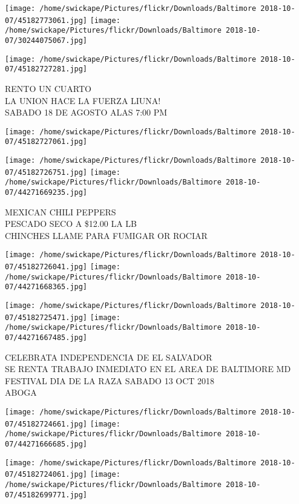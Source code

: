\documentclass[10pt,letterpaper]{article}
\begin{document}
\texttt{[image: /home/swickape/Pictures/flickr/Downloads/Baltimore 2018-10-07/45182773061.jpg]}
\texttt{[image: /home/swickape/Pictures/flickr/Downloads/Baltimore 2018-10-07/30244075067.jpg]}

\texttt{[image: /home/swickape/Pictures/flickr/Downloads/Baltimore 2018-10-07/45182727281.jpg]}

RENTO UN CUARTO\\
LA UNION HACE LA FUERZA LIUNA!\\
SABADO 18 DE AGOSTO ALAS 7:00 PM\\
\pagebreak

\texttt{[image: /home/swickape/Pictures/flickr/Downloads/Baltimore 2018-10-07/45182727061.jpg]}

\vspace{0.25in}
\texttt{[image: /home/swickape/Pictures/flickr/Downloads/Baltimore 2018-10-07/45182726751.jpg]}
\texttt{[image: /home/swickape/Pictures/flickr/Downloads/Baltimore 2018-10-07/44271669235.jpg]}

MEXICAN CHILI PEPPERS\\
PESCADO SECO A \$12.00 LA LB\\
CHINCHES LLAME PARA FUMIGAR OR ROCIAR\\
\pagebreak

\texttt{[image: /home/swickape/Pictures/flickr/Downloads/Baltimore 2018-10-07/45182726041.jpg]}
\texttt{[image: /home/swickape/Pictures/flickr/Downloads/Baltimore 2018-10-07/44271668365.jpg]}

\texttt{[image: /home/swickape/Pictures/flickr/Downloads/Baltimore 2018-10-07/45182725471.jpg]}
\texttt{[image: /home/swickape/Pictures/flickr/Downloads/Baltimore 2018-10-07/44271667485.jpg]}

CELEBRATA INDEPENDENCIA DE EL SALVADOR\\
SE RENTA TRABAJO INMEDIATO EN EL AREA DE BALTIMORE MD\\
FESTIVAL DIA DE LA RAZA SABADO 13 OCT 2018\\
ABOGA\\
\pagebreak

\texttt{[image: /home/swickape/Pictures/flickr/Downloads/Baltimore 2018-10-07/45182724661.jpg]}
\texttt{[image: /home/swickape/Pictures/flickr/Downloads/Baltimore 2018-10-07/44271666685.jpg]}

\texttt{[image: /home/swickape/Pictures/flickr/Downloads/Baltimore 2018-10-07/45182724061.jpg]}
\texttt{[image: /home/swickape/Pictures/flickr/Downloads/Baltimore 2018-10-07/45182699771.jpg]}
\end{document}
